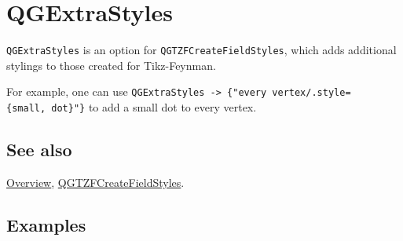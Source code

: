 \documentclass[../FeynHelpersManual.tex]{subfiles}
\begin{document}
\hypertarget{qgextrastyles}{
\section{QGExtraStyles}\label{qgextrastyles}}

\texttt{QGExtraStyles} is an option for \texttt{QGTZFCreateFieldStyles},
which adds additional stylings to those created for Tikz-Feynman.

For example, one can use
\texttt{QGExtraStyles -> \{\allowbreak{}"every vertex/.style=\{\allowbreak{}small,\ \allowbreak{}dot\}"\}}
to add a small dot to every vertex.

\subsection{See also}

\hyperlink{toc}{Overview},
\hyperlink{qgtzfcreatefieldstyles}{QGTZFCreateFieldStyles}.

\subsection{Examples}
\end{document}
